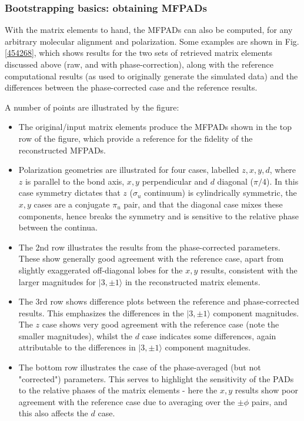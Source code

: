 \subsubsection{Bootstrapping basics: obtaining MFPADs}

With the matrix elements to hand, the MFPADs can also be computed, for any arbitrary molecular alignment and polarization. Some examples are shown in Fig. \ref{454268}, which shows results for the two sets of retrieved matrix elements discussed above (raw, and with phase-correction), along with the reference computational results (as used to originally generate the simulated data) and the differences between the phase-corrected case and the reference results.

A number of points are illustrated by the figure:

\begin{itemize}
\item The original/input matrix elements produce the MFPADs shown in the top row of the figure, which provide a reference for the fidelity of the reconstructed MFPADs. 
\item Polarization geometries are illustrated for four cases, labelled $z,x,y,d$, where $z$ is parallel to the bond axis, $x,y$ perpendicular and $d$ diagonal ($\pi/4$). In this case symmetry dictates that $z$ ($\sigma_u$ continuum) is cylindrically symmetric, the $x,y$ cases are a conjugate $\pi_u$ pair, and that the diagonal case mixes these components, hence breaks the symmetry and is sensitive to the relative phase between the continua.
\item The 2nd row illustrates the results from the phase-corrected parameters. These show generally good agreement with the reference case, apart from slightly exaggerated off-diagonal lobes for the $x,y$ results, consistent with the larger magnitudes for $|3,\pm1\rangle$ in the reconstructed matrix elements.
\item The 3rd row shows difference plots between the reference and phase-corrected results. This emphasizes the differences in the $|3,\pm1\rangle$ component magnitudes. The $z$ case shows very good agreement with the reference case (note the smaller magnitudes), whilst the $d$ case indicates some differences, again attributable to the differences in $|3,\pm1\rangle$ component magnitudes.
\item The bottom row illustrates the case of the phase-averaged (but not "corrected") parameters. This serves to highlight the sensitivity of the PADs to the relative phases of the matrix elements - here the $x,y$ results show poor agreement with the reference case due to averaging over the $\pm\phi$ pairs, and this also affects the $d$ case.
\end{itemize}

